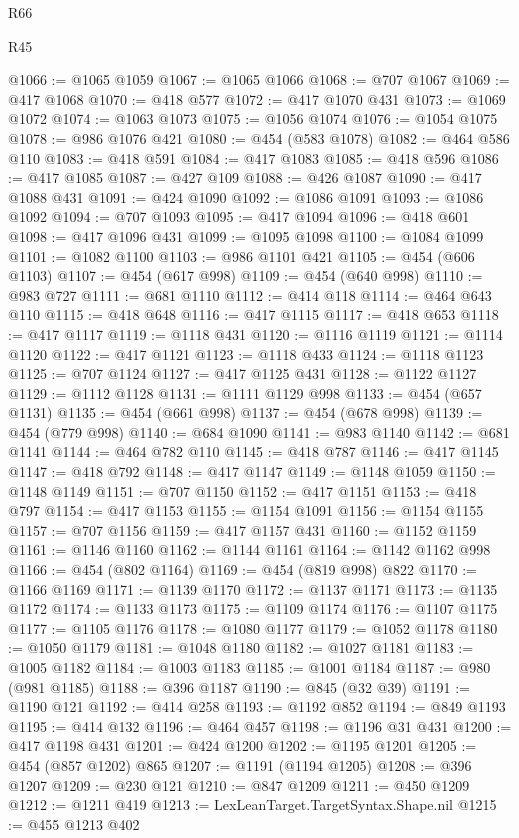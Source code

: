 \begin{lexlean}{R66}
\begin{lexlean}{R45}
\begin{coremodule}
{{{{{{{{{{{{{{{{{{{{{{{{{{{{{{{{{{{{{{{{{{{{{{{{{{{{{{{{{{{{{{{{{{{{{{{{{{{{{{{{{{{{{{{{{{{@1066 := @1065 @1059
@1067 := @1065 @1066
@1068 := @707 @1067
@1069 := @417 @1068
@1070 := @418 @577
@1072 := @417 @1070 @431
@1073 := @1069 @1072
@1074 := @1063 @1073
@1075 := @1056 @1074
@1076 := @1054 @1075
@1078 := @986 @1076 @421
@1080 := @454 (@583 @1078)
@1082 := @464 @586 @110
@1083 := @418 @591
@1084 := @417 @1083
@1085 := @418 @596
@1086 := @417 @1085
@1087 := @427 @109
@1088 := @426 @1087
@1090 := @417 @1088 @431
@1091 := @424 @1090
@1092 := @1086 @1091
@1093 := @1086 @1092
@1094 := @707 @1093
@1095 := @417 @1094
@1096 := @418 @601
@1098 := @417 @1096 @431
@1099 := @1095 @1098
@1100 := @1084 @1099
@1101 := @1082 @1100
@1103 := @986 @1101 @421
@1105 := @454 (@606 @1103)
@1107 := @454 (@617 @998)
@1109 := @454 (@640 @998)
@1110 := @983 @727
@1111 := @681 @1110
@1112 := @414 @118
@1114 := @464 @643 @110
@1115 := @418 @648
@1116 := @417 @1115
@1117 := @418 @653
@1118 := @417 @1117
@1119 := @1118 @431
@1120 := @1116 @1119
@1121 := @1114 @1120
@1122 := @417 @1121
@1123 := @1118 @433
@1124 := @1118 @1123
@1125 := @707 @1124
@1127 := @417 @1125 @431
@1128 := @1122 @1127
@1129 := @1112 @1128
@1131 := @1111 @1129 @998
@1133 := @454 (@657 @1131)
@1135 := @454 (@661 @998)
@1137 := @454 (@678 @998)
@1139 := @454 (@779 @998)
@1140 := @684 @1090
@1141 := @983 @1140
@1142 := @681 @1141
@1144 := @464 @782 @110
@1145 := @418 @787
@1146 := @417 @1145
@1147 := @418 @792
@1148 := @417 @1147
@1149 := @1148 @1059
@1150 := @1148 @1149
@1151 := @707 @1150
@1152 := @417 @1151
@1153 := @418 @797
@1154 := @417 @1153
@1155 := @1154 @1091
@1156 := @1154 @1155
@1157 := @707 @1156
@1159 := @417 @1157 @431
@1160 := @1152 @1159
@1161 := @1146 @1160
@1162 := @1144 @1161
@1164 := @1142 @1162 @998
@1166 := @454 (@802 @1164)
@1169 := @454 (@819 @998) @822
@1170 := @1166 @1169
@1171 := @1139 @1170
@1172 := @1137 @1171
@1173 := @1135 @1172
@1174 := @1133 @1173
@1175 := @1109 @1174
@1176 := @1107 @1175
@1177 := @1105 @1176
@1178 := @1080 @1177
@1179 := @1052 @1178
@1180 := @1050 @1179
@1181 := @1048 @1180
@1182 := @1027 @1181
@1183 := @1005 @1182
@1184 := @1003 @1183
@1185 := @1001 @1184
@1187 := @980 (@981 @1185)
@1188 := @396 @1187
@1190 := @845 (@32 @39)
@1191 := @1190 @121
@1192 := @414 @258
@1193 := @1192 @852
@1194 := @849 @1193
@1195 := @414 @132
@1196 := @464 @457
@1198 := @1196 @31 @431
@1200 := @417 @1198 @431
@1201 := @424 @1200
@1202 := @1195 @1201
@1205 := @454 (@857 @1202) @865
@1207 := @1191 (@1194 @1205)
@1208 := @396 @1207
@1209 := @230 @121
@1210 := @847 @1209
@1211 := @450 @1209
@1212 := @1211 @419
@1213 := LexLeanTarget.TargetSyntax.Shape.nil
@1215 := @455 @1213 @402
}}}}}}}}}}}}}}}}}}}}}}}}}}}}}}}}}}}}}}}}}}}}}}}}}}}}}}}}}}}}}}}}}}}}}}}}}}}}}}}}}}}}}}}}}}}
\end{coremodule}
\end{lexlean}
\end{lexlean}
